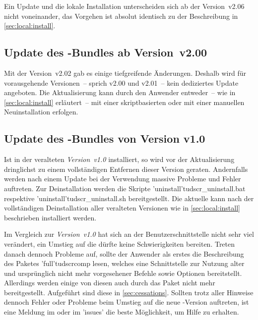 Ein Update und die lokale Installation unterscheiden sich ab der Version~v2.06 
nicht voneinander, das Vorgehen ist absolut identisch zu der Beschreibung in 
\autoref{sec:local:install}.



\subsection{Update des \TUDScript-Bundles ab Version~v2.00}

Mit der Version~v2.02 gab es einige tiefgreifende Änderungen. Deshalb wird für 
vorausgehende Versionen~-- sprich v2.00 und v2.01~-- kein dediziertes Update 
angeboten. Die Aktualisierung kann durch den Anwender entweder~-- wie in 
\autoref{sec:local:install} erläutert~-- mit einer skriptbasierten oder mit 
einer manuellen Neuinstallation erfolgen.%
%



\subsection{Update des \TUDScript-Bundles von Version v1.0}

Ist \TUDScript in der veralteten \emph{Version~v1.0} installiert, so wird vor 
der Aktualisierung dringlichst zu einem vollständigen Entfernen dieser Version 
geraten. Andernfalls werden nach einem Update bei der Verwendung massive 
Probleme und Fehler auftreten. Zur Deinstallation werden die Skripte 
\GitHubFile*'uninstall'{tudscr_uninstall.bat} respektive
\GitHubFile*'uninstall'{tudscr_uninstall.sh} bereitgestellt. Die aktuelle 
 kann nach der vollständigen Deinstallation aller 
veralteten Versionen wie in \autoref{sec:local:install} beschrieben installiert 
werden.

Im Vergleich zur \emph{Version~v1.0} hat sich an der Benutzerschnittstelle 
nicht sehr viel verändert, ein Umstieg auf die  dürfte 
keine Schwierigkeiten bereiten. Treten danach dennoch Probleme auf, sollte der 
Anwender als erstes die Beschreibung des Paketes \Package'full'{tudscrcomp} 
lesen, welches eine Schnittstelle zur Nutzung alter und ursprünglich nicht mehr 
vorgesehener Befehle sowie Optionen bereitstellt. Allerdings werden einige von 
diesen auch durch das Paket  nicht mehr bereitgestellt. 
Aufgeführt sind diese in \autoref{sec:cessations}. Sollten trotz aller Hinweise 
dennoch Fehler oder Probleme beim Umstieg auf die neue \TUDScript-Version 
auftreten, ist eine Meldung im \Forum oder im \GitHubRepo'issues' die beste 
Möglichkeit, um Hilfe zu erhalten.



